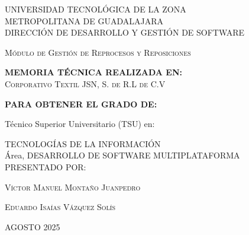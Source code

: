 \documentclass[12pt,letterpaper,spanish]{report}
\begin{document}
\thispagestyle{empty}


\begin{center}

 \begin{minipage}[b]{.9\linewidth}
    \begin{center}
        \vspace{0.2in}
        \large{UNIVERSIDAD TECNOLÓGICA DE LA ZONA \\METROPOLITANA DE GUADALAJARA}\\
        \large{DIRECCIÓN DE DESARROLLO Y GESTIÓN DE SOFTWARE}\\
    \end{center}
\end{minipage}
\vspace{0.3in}


\centerline{\hbox{}}

\LARGE{\textsc{Módulo de Gestión de Reprocesos y Reposiciones}}

\vspace{0.2in}
\large{\textbf{MEMORIA TÉCNICA REALIZADA EN:}}
 \\  \textsc{Corporativo Textil JSN, S. de R.L de C.V}

\vspace{0.2in}
\large{\textbf{PARA OBTENER EL GRADO DE:}}

\large{Técnico Superior Universitario (TSU) en:}


\large{TECNOLOGÍAS DE LA INFORMACIÓN\\Área, DESARROLLO DE SOFTWARE MULTIPLATAFORMA }
\\

\vspace{0.2in}
\large{PRESENTADO POR:}


\textsc{Víctor Manuel Montaño Juanpedro}  %


\textsc{Eduardo Isaías Vázquez Solís}  %

\vspace{0.2in}
\small{ AGOSTO 2025}
\end{center}


\newpage



\end{document}
